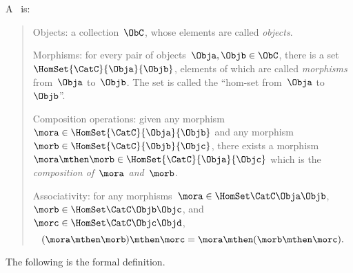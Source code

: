 \section{}


\begin{ctdefinition}[Semicategory]
  \label{def:semicategory}
  A \emph{}~\CatC is:
\begin{quote}
    \constit
  \begin{compactenum}
    \item Objects: a collection\footnotemark~$\ObC$, whose elements are called \emph{objects}.
    \item Morphisms: for every pair of objects~$\Obja,\Objb\in \ObC$, there is a set~$\HomSet{\CatC}{\Obja}{\Objb}$, elements of which are called
    \emph{morphisms} from~$\Obja$ to~$\Objb$. The set is called the ``hom-set from~$\Obja$ to~$\Objb$''.
    \item Composition operations: given any morphism~${\mora} \in  \HomSet{\CatC}{\Obja}{\Objb}$ and any morphism~${\morb} \in \HomSet{\CatC}{\Objb}{\Objc}$, there exists a morphism~$\mora \mthen \morb\in \HomSet{\CatC}{\Obja}{\Objc}$ which is the \emph{composition of~$\mora$ and~$\morb$}.
  \end{compactenum}
 \condit
  \begin{compactenum}
    \item Associativity: for any morphisms~$\mora\in \HomSet\CatC\Obja\Objb$,~$\morb\in \HomSet\CatC\Objb\Objc$, and~$\morc\in \HomSet\CatC\Objc\Objd$,
    \begin{equation}
    (\mora\mthen \morb)
      \mthen \morc= \mora \mthen (\morb \mthen \morc).
    \end{equation}
  \end{compactenum}
  \end{quote}
\end{ctdefinition}



The following is the formal definition.

%
%


